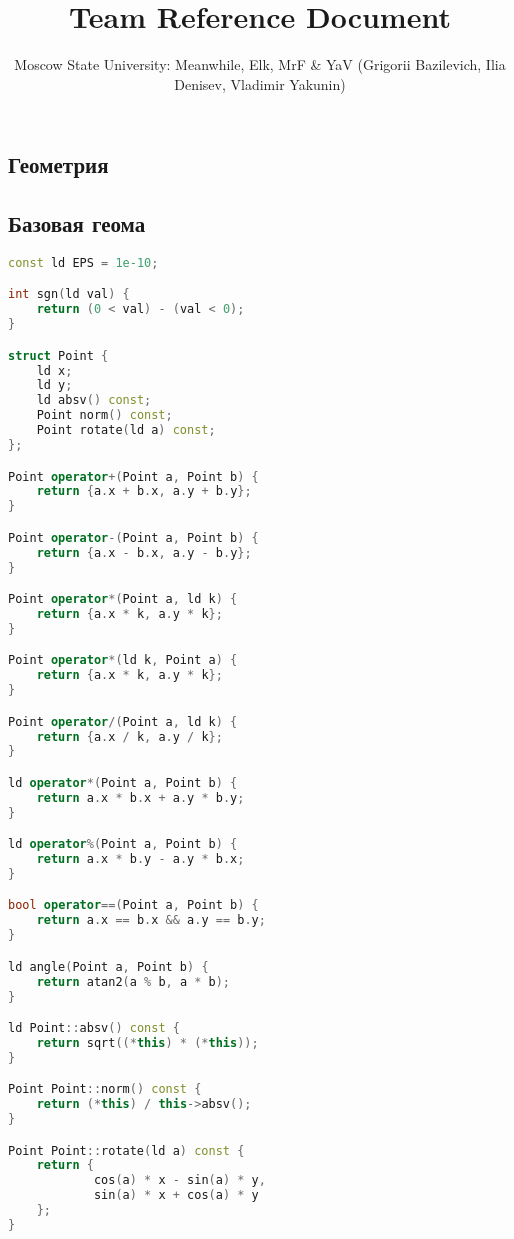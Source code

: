 \documentclass[10pt,a4paper,landscape,twosided]{extarticle}
\begin{document}
\title{Team Reference Document}
\author{Moscow State University: Meanwhile, Elk, MrF \& YaV (Grigorii Bazilevich, Ilia Denisev, Vladimir Yakunin)}
\maketitle
\begin{multicols}{3}

\tableofcontents
{}


\section{Геометрия}

\subsection{Базовая геома}
\begin{lstlisting}[language=C++]
const ld EPS = 1e-10;

int sgn(ld val) {
    return (0 < val) - (val < 0);
}

struct Point {
    ld x;
    ld y;
    ld absv() const;
    Point norm() const;
    Point rotate(ld a) const;
};

Point operator+(Point a, Point b) {
    return {a.x + b.x, a.y + b.y};
}

Point operator-(Point a, Point b) {
    return {a.x - b.x, a.y - b.y};
}

Point operator*(Point a, ld k) {
    return {a.x * k, a.y * k};
}

Point operator*(ld k, Point a) {
    return {a.x * k, a.y * k};
}

Point operator/(Point a, ld k) {
    return {a.x / k, a.y / k};
}

ld operator*(Point a, Point b) {
    return a.x * b.x + a.y * b.y;
}

ld operator%(Point a, Point b) {
    return a.x * b.y - a.y * b.x;
}

bool operator==(Point a, Point b) {
    return a.x == b.x && a.y == b.y;
}

ld angle(Point a, Point b) {
    return atan2(a % b, a * b);
}

ld Point::absv() const {
    return sqrt((*this) * (*this));
}

Point Point::norm() const {
    return (*this) / this->absv();
}

Point Point::rotate(ld a) const {
    return {
            cos(a) * x - sin(a) * y,
            sin(a) * x + cos(a) * y
    };
}


\end{lstlisting}
\end{multicols}
\end{document}
